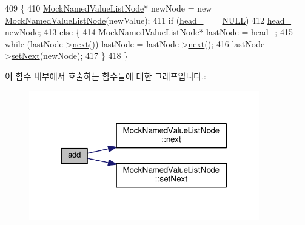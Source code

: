 \begin{DoxyCode}
409 \{
410     \hyperlink{class_mock_named_value_list_node}{MockNamedValueListNode}* newNode = \textcolor{keyword}{new} 
      \hyperlink{class_mock_named_value_list_node}{MockNamedValueListNode}(newValue);
411     \textcolor{keywordflow}{if} (\hyperlink{class_mock_named_value_list_a3bb1ff05bd34f0ac2f0ff66d8f5e2978}{head\_} == \hyperlink{openavb__types__base__pub_8h_a070d2ce7b6bb7e5c05602aa8c308d0c4}{NULL})
412         \hyperlink{class_mock_named_value_list_a3bb1ff05bd34f0ac2f0ff66d8f5e2978}{head\_} = newNode;
413     \textcolor{keywordflow}{else} \{
414         \hyperlink{class_mock_named_value_list_node}{MockNamedValueListNode}* lastNode = \hyperlink{class_mock_named_value_list_a3bb1ff05bd34f0ac2f0ff66d8f5e2978}{head\_};
415         \textcolor{keywordflow}{while} (lastNode->\hyperlink{class_mock_named_value_list_node_adaf0ca3232d35f7efae1bade86b8027e}{next}()) lastNode = lastNode->\hyperlink{class_mock_named_value_list_node_adaf0ca3232d35f7efae1bade86b8027e}{next}();
416         lastNode->\hyperlink{class_mock_named_value_list_node_aaf65c8dad0363e65312a8b1d06e0911b}{setNext}(newNode);
417     \}
418 \}
\end{DoxyCode}


이 함수 내부에서 호출하는 함수들에 대한 그래프입니다.\+:
\nopagebreak
\begin{figure}[H]
\begin{center}
\leavevmode
\includegraphics[width=284pt]{class_mock_named_value_list_af014a0a639125fd0c69df2aadcd22bf6_cgraph}
\end{center}
\end{figure}




